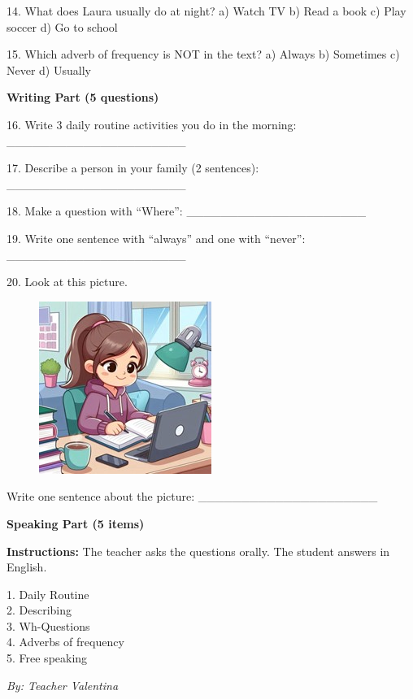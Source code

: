 \documentclass[12pt, a4paper]{article}
\begin{document}
14. What does Laura usually do at night?
a) Watch TV \quad b) Read a book \quad c) Play soccer \quad d) Go to school

\smallskip

15. Which adverb of frequency is NOT in the text?
a) Always \quad b) Sometimes \quad c) Never \quad d) Usually

\begin{center}
    \large \textbf{Writing Part (5 questions)}
\end{center}

16. Write 3 daily routine activities you do in the morning: \_\_\_\_\_\_\_\_\_\_\_\_\_\_\_\_\_\_\_\_\_

\smallskip

17. Describe a person in your family (2 sentences): \_\_\_\_\_\_\_\_\_\_\_\_\_\_\_\_\_\_\_\_\_

\smallskip

18. Make a question with ``Where'': \_\_\_\_\_\_\_\_\_\_\_\_\_\_\_\_\_\_\_\_\_

\smallskip

19. Write one sentence with ``always'' and one with ``never'': \_\_\_\_\_\_\_\_\_\_\_\_\_\_\_\_\_\_\_\_\_

\smallskip

20. Look at this picture.

\begin{figure}[H]
    \includegraphics[width=.4\linewidth]{../../../images/Imagen2.jpg}
\end{figure}

Write one sentence about the picture:
\_\_\_\_\_\_\_\_\_\_\_\_\_\_\_\_\_\_\_\_\_

\begin{center}
    \large \textbf{Speaking Part (5 items)}
\end{center}

\textbf{Instructions:} The teacher asks the questions orally. The student answers in English.

1. Daily Routine \\
2. Describing \\
3. Wh-Questions \\
4. Adverbs of frequency \\
5. Free speaking

\vfill
\begin{flushright}
    \textit{By: Teacher Valentina}
\end{flushright}
\end{document}

